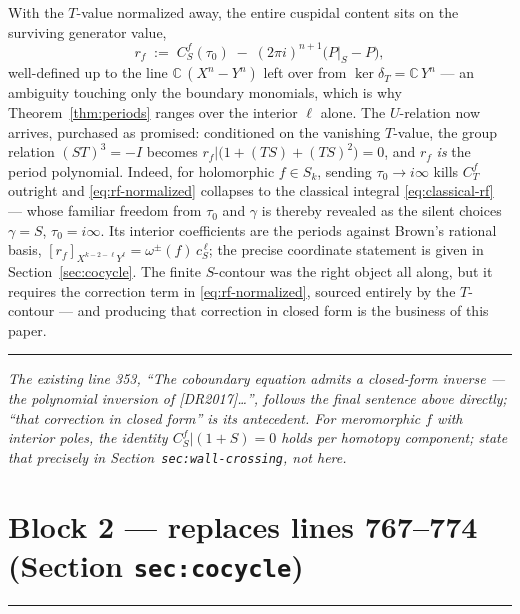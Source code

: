 \documentclass[11pt]{article}
\newcommand{\CC}{\mathbb{C}}
\newcommand{\blockrule}{\par\noindent\rule{\textwidth}{0.8pt}\par}
\newenvironment{whereitgoes}
  {\par\medskip\noindent\begin{minipage}{\textwidth}\small\itshape\color{black!70}}
  {\end{minipage}\par\medskip}
\begin{document}
With the $T$-value normalized away, the entire cuspidal content sits on
the surviving generator value,
\begin{equation}\label{eq:rf-normalized}
  r_f \;:=\; C^f_S(\tau_0) \;-\; (2\pi i)^{n+1}\bigl(P|_S - P\bigr),
\end{equation}
well-defined up to the line $\CC\,(X^n - Y^n)$ left over from
$\ker \delta_T = \CC\, Y^n$ --- an ambiguity touching only the boundary
monomials, which is why Theorem~\ref{thm:periods} ranges over the
interior $\ell$ alone.  The $U$-relation now arrives, purchased as
promised: conditioned on the vanishing $T$-value, the group relation
$(ST)^3 = -I$ becomes $r_f|\bigl(1 + (TS) + (TS)^2\bigr) = 0$, and $r_f$
\emph{is} the period polynomial.  Indeed, for holomorphic $f \in S_k$,
sending $\tau_0 \to i\infty$ kills $C^f_T$ outright and
\eqref{eq:rf-normalized} collapses to the classical integral
\eqref{eq:classical-rf} --- whose familiar freedom from $\tau_0$ and
$\gamma$ is thereby revealed as the silent choices $\gamma = S$,
$\tau_0 = i\infty$.  Its interior coefficients are the periods against
Brown's rational basis,
$[r_f]_{X^{k-2-\ell}Y^\ell} = \omega^\pm(f)\, c_S^{\,\ell}$; the precise
coordinate statement is given in Section~\ref{sec:cocycle}.  The finite
$S$-contour was the right object all along, but it requires the
correction term in \eqref{eq:rf-normalized}, sourced entirely by the
$T$-contour --- and producing that correction in closed form is the
business of this paper.


\blockrule
\begin{whereitgoes}
The existing line 353, ``The coboundary equation admits a closed-form
inverse --- the polynomial inversion of [DR2017]\ldots'', follows the
final sentence above directly; ``that correction in closed form'' is its
antecedent.  For meromorphic $f$ with interior poles, the identity
$C^f_S|(1+S) = 0$ holds per homotopy component; state that precisely in
Section~\texttt{sec:wall-crossing}, not here.
\end{whereitgoes}

\section*{Block 2 --- replaces lines 767--774 (Section \texttt{sec:cocycle})}
\blockrule
\end{document}
